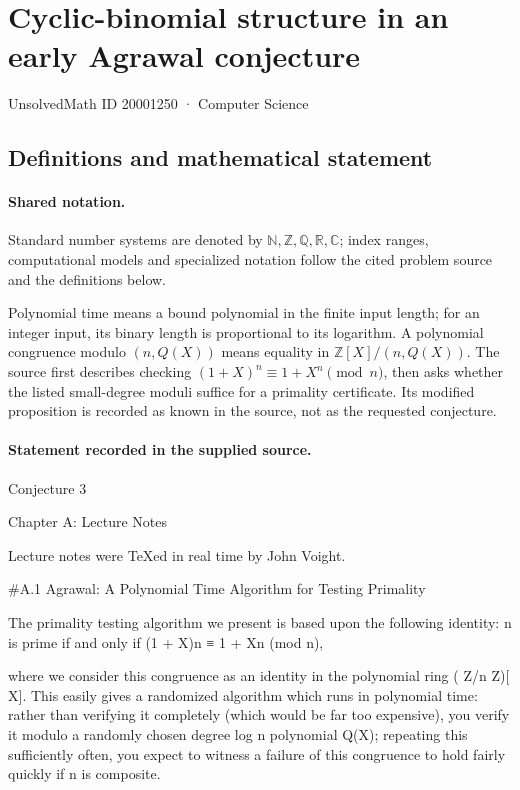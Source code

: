 \documentclass[11pt]{article}
\begin{document}
\setcounter{section}{20001249}
\section{Cyclic-binomial structure in an early Agrawal conjecture}\label{20001250}
{\small\sffamily UnsolvedMath ID 20001250 · Computer Science}
\subsection{Definitions and mathematical statement}

\paragraph{Shared notation.}Standard number systems are denoted by $\mathbb N,\mathbb Z,\mathbb Q,\mathbb R,\mathbb C$; index ranges, computational models and specialized notation follow the cited problem source and the definitions below.


Polynomial time means a bound polynomial in the finite input length; for an integer input, its binary length is proportional to its logarithm. A polynomial congruence modulo $(n,Q(X))$ means equality in $\mathbb Z[X]/(n,Q(X))$. The source first describes checking $(1+X)^n\equiv1+X^n\pmod n$, then asks whether the listed small-degree moduli suffice for a primality certificate. Its modified proposition is recorded as known in the source, not as the requested conjecture.
\paragraph{Statement recorded in the supplied source.}
Conjecture 3

Chapter A: Lecture Notes

Lecture notes were TeXed in real time by John Voight.

\#A.1 Agrawal: A Polynomial Time Algorithm for Testing Primality

The primality testing algorithm we present is based upon the following identity: n is prime if and only if (1 + X)n ≡ 1 + Xn (mod n),

where we consider this congruence as an identity in the polynomial ring ( Z/n Z)[ X]. This easily gives a randomized algorithm which runs in polynomial time: rather than verifying it completely (which would be far too expensive), you verify it modulo a randomly chosen degree log n polynomial Q(X); repeating this sufficiently often, you expect to witness a failure of this congruence to hold fairly quickly if n is composite.
\end{document}

